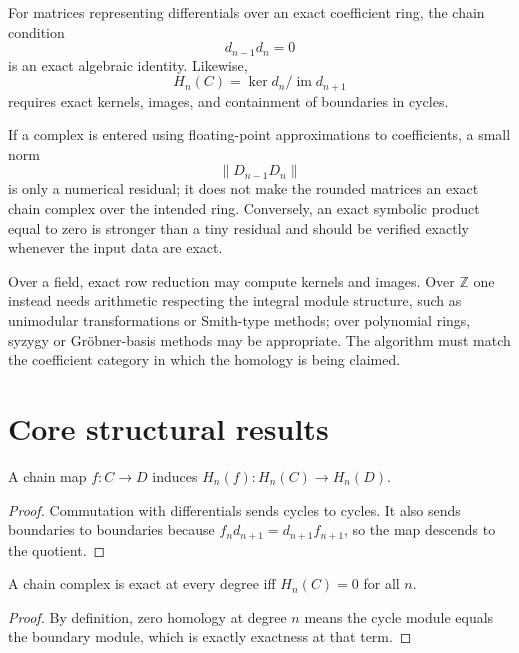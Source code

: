 \begin{remark}
For matrices representing differentials over an exact coefficient ring, the
chain condition
\[
d_{n-1}d_n=0
\]
is an exact algebraic identity.  Likewise,
\[
H_n(C)=\ker d_n/\operatorname{im}d_{n+1}
\]
requires exact kernels, images, and containment of boundaries in cycles.

If a complex is entered using floating-point approximations to coefficients,
a small norm
\[
\|D_{n-1}D_n\|
\]
is only a numerical residual; it does not make the rounded matrices an exact
chain complex over the intended ring.  Conversely, an exact symbolic product
equal to zero is stronger than a tiny residual and should be verified exactly
whenever the input data are exact.

Over a field, exact row reduction may compute kernels and images.  Over
\(\mathbb Z\) one instead needs arithmetic respecting the integral module
structure, such as unimodular transformations or Smith-type methods; over
polynomial rings, syzygy or Gr\"obner-basis methods may be appropriate.
The algorithm must match the coefficient category in which the homology is
being claimed.
\end{remark}

\section{Core structural results}

\begin{theorem}\label{thm:v22-01}
A chain map $f:C\to D$ induces $H_n(f):H_n(C)\to H_n(D)$.
\begin{proof}
Commutation with differentials sends cycles to cycles. It also sends boundaries to boundaries because $f_n d_{n+1}=d_{n+1}f_{n+1}$, so the map descends to the quotient.
\end{proof}
\end{theorem}

\begin{theorem}\label{thm:v22-02}
A chain complex is exact at every degree iff $H_n(C)=0$ for all $n$.
\begin{proof}
By definition, zero homology at degree $n$ means the cycle module equals the boundary module, which is exactly exactness at that term.
\end{proof}
\end{theorem}

